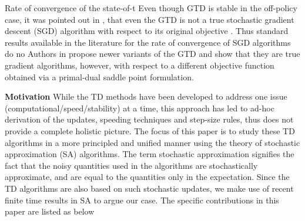 Rate of convergence of the state-of-t
Even though GTD is stable in the off-policy case, it was pointed out in \cite{}, that even the GTD is not a true stochastic gradient descent (SGD) algorithm with respect to its original objective \cite{}.  Thus standard results available in the literature for the rate of convergence of SGD algorithms do no Authors in \cite{} propose newer variants of the GTD and show that they are true gradient algorithms, however, with respect to a different objective function obtained via a primal-dual saddle point formulation.\par
\begin{comment}
Another related and important aspect of concern is the speed of convergence. A typical step-size rule is to choose them to diminish at a rate of $O(1/t)$ with respect to time. However, such step-sizes might be problem sensitive and can lead to poor speed of convergence. One remedy in the literature was to use the idea of speeding TD learning was used in speedy Q-learning (SQL) \cite{sql}. \cite{} uses adaptive step sizes based on the TD error to achieve faster learning rates. Recent RL algorithms such as GTD-MP claim to make use of ideas of accelerated gradient descent to achieve increase speed of convergence.\par
\end{comment}
\textbf{Motivation} While the TD methods have been developed to address one issue (computational/speed/stability) at a time, this approach has led to ad-hoc derivation of the updates, speeding techniques and step-size rules, thus does not provide a complete holistic picture. The focus of this paper is to study these TD algorithms in a more principled and unified manner using the theory of stochastic approximation (SA) algorithms. The term stochastic approximation signifies the fact that the noisy quantities used in the algorithms are stochastically approximate, and are equal to the quantities only in the expectation. Since the TD algorithms are also based on such stochastic updates, we make use of recent finite time results in SA \cite{} to argue our case. The specific contributions in this paper are listed as below
